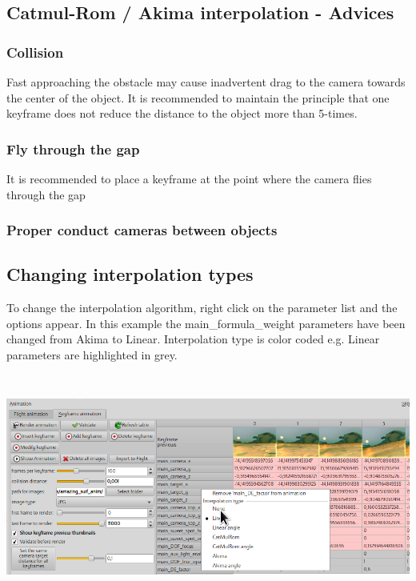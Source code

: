 \subsection{Catmul-Rom / Akima interpolation -
	Advices}\label{catmul-rom-akima-interpolation---advices}

\subsubsection{Collision}\label{collision}

Fast approaching the obstacle may cause inadvertent drag to the camera towards
the center of the object. It is recommended to maintain the principle that one
keyframe does not reduce the distance to the object more than 5-times.

\subsubsection{Fly through the gap}\label{fly-through-the-gap}

It is recommended to place a keyframe at the point where the camera flies
through the gap

\subsubsection{Proper conduct cameras between
	objects}\label{proper-conduct-cameras-between-objects}

\subsection{Changing interpolation types}\label{changing-interpolation-types}

To change the interpolation algorithm, right click on the parameter list and the
options appear. In this example the main\_formula\_weight parameters have been
changed from Akima to Linear. Interpolation type is color coded e.g. Linear
parameters are highlighted in grey.

\includegraphics[width=6.69291in,height=2.92087in]{img/manual/media/image26.png}

